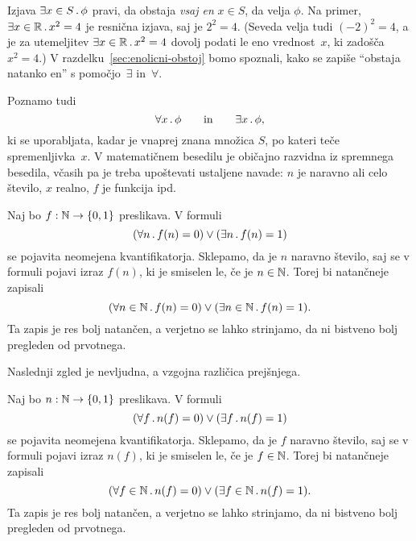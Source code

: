 Izjava $\exists x \in S \,.\, \phi$ pravi, da obstaja \emph{vsaj en} $x \in S$, da velja $\phi$. Na primer,
$\exists x \in \mathbb{R} \,.\, x^2 = 4$ je resnična izjava, saj je $2^2 = 4$. (Seveda velja tudi $(-2)^2 = 4$, a je za utemeljitev $\exists x \in \mathbb{R} \,.\, x^2 = 4$ dovolj podati le eno vrednost~$x$, ki zadošča $x^2 = 4$.)
%
V razdelku~\ref{sec:enolicni-obstoj} bomo spoznali, kako se zapiše ``obstaja natanko en'' s pomočjo~$\exists$ in~$\forall$.

Poznamo tudi  
%
\begin{equation*}
  \forall x \,.\, \phi
  \qquad\text{in}\qquad
  \exists x \,.\, \phi,
\end{equation*}
%
ki se uporabljata, kadar je vnaprej znana množica $S$,
po kateri teče spremenljivka~$x$. V matematičnem besedilu je običajno
razvidna iz spremnega besedila, včasih pa je treba upoštevati
ustaljene navade: $n$ je naravno ali celo število, $x$ realno, $f$ je
funkcija ipd.

\begin{zgled}
  Naj bo $f : \mathbb{N} \to \left\{0, 1\right\}$ preslikava. V formuli
  \begin{equation*}
    (\forall n \,.\, f(n) = 0) \lor (\exists n \,.\, f(n) = 1)
  \end{equation*}
  se pojavita neomejena kvantifikatorja. Sklepamo, da je $n$ naravno število, saj se v formuli pojavi izraz $f(n)$,
  ki je smiselen le, če je $n \in \mathbb{N}$. Torej bi natančneje zapisali
  \begin{equation*}
    (\forall n \in \mathbb{N} \,.\, f(n) = 0) \lor (\exists n \in \mathbb{N} \,.\, f(n) = 1).
  \end{equation*}
  Ta zapis je res bolj natančen, a verjetno se lahko strinjamo, da ni bistveno bolj pregleden od prvotnega.
\end{zgled}

Naslednji zgled je nevljudna, a vzgojna različica prejšnjega.

\begin{zgled}
  Naj bo $n : \mathbb{N} \to \left\{0, 1\right\}$ preslikava. V formuli
  \begin{equation*}
    (\forall f \,.\, n(f) = 0) \lor (\exists f \,.\, n(f) = 1)
  \end{equation*}
  se pojavita neomejena kvantifikatorja. Sklepamo, da je $f$ naravno število, saj se v formuli pojavi izraz $n(f)$,
  ki je smiselen le, če je $f \in \mathbb{N}$. Torej bi natančneje zapisali
  \begin{equation*}
    (\forall f \in \mathbb{N} \,.\, n(f) = 0) \lor (\exists f \in \mathbb{N} \,.\, n(f) = 1).
  \end{equation*}
  Ta zapis je res bolj natančen, a verjetno se lahko strinjamo, da ni bistveno bolj pregleden od prvotnega.
\end{zgled}



